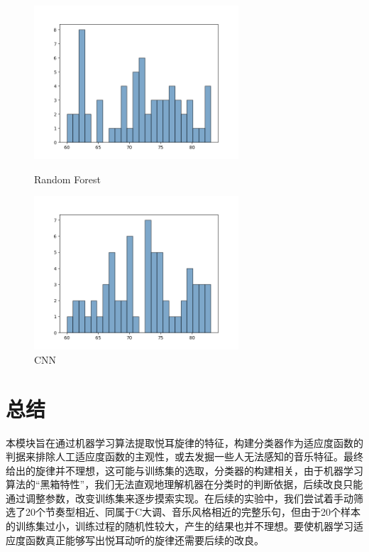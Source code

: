 \documentclass[UTF8,a4paper,10pt]{ctexart}
\begin{document}
\begin{itemize}
\begin{figure}[H]
\begin{minipage}[t]{0.5\linewidth}
\centering
\includegraphics[width=3in]{output_forest_hist_1.png}
\caption{Random Forest}
\label{fig:side:a}
\end{minipage}%
\begin{minipage}[t]{0.5\linewidth}
\centering
\includegraphics[width=3in]{output_cnn_hist_1.png}
\caption{CNN}
\label{fig:side:b}
\end{minipage}
\end{figure}
\end{itemize}

\section{\textcolor[rgb]{0,0.3,0.6}{总结}}

本模块旨在通过机器学习算法提取悦耳旋律的特征，构建分类器作为适应度函数的判据来排除人工适应度函数的主观性，或去发掘一些人无法感知的音乐特征。最终给出的旋律并不理想，这可能与训练集的选取，分类器的构建相关，由于机器学习算法的“黑箱特性”，我们无法直观地理解机器在分类时的判断依据，后续改良只能通过调整参数，改变训练集来逐步摸索实现。在后续的实验中，我们尝试着手动筛选了20个节奏型相近、同属于C大调、音乐风格相近的完整乐句，但由于20个样本的训练集过小，训练过程的随机性较大，产生的结果也并不理想。要使机器学习适应度函数真正能够写出悦耳动听的旋律还需要后续的改良。
\end{document}
